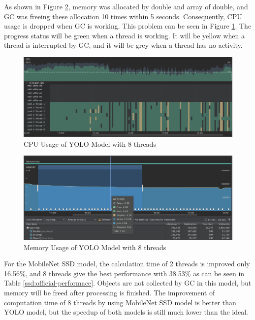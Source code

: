             As shown in Figure \ref{yolo:memoryUsage}, memory was allocated by double and array of double,
                and GC was freeing these allocation 10 times within 5 seconds.
            Consequently, CPU usage is dropped when GC is working.
                This problem can be seen in Figure \ref{yolo:cpuUsage}.
                The progress status will be green when a thread is working.
                It will be yellow when a thread is interrupted by GC,
                and it will be grey when a thread has no activity.

            \begin{figure}[!ht]
                \includegraphics[width=6in]{images/chapter5/YOLO/cpu-8-thread-crop.png}
                \caption{CPU Usage of YOLO Model with 8 threads}
                \label{yolo:cpuUsage}
            \end{figure}

            \begin{figure}[!ht]
                \includegraphics[width=6in]{images/chapter5/gc-problem/gc-collecting-crop.png}
                \caption{Memory Usage of YOLO Model with 8 threads}
                \label{yolo:memoryUsage}
            \end{figure}

            For the MobileNet SSD model,
            the calculation time of 2 threads is improved only 16.56\%,
            and 8 threads give the best performance with 38.53\% as can be seen in Table \ref{ssd:official-performace}.
            Objects are not collected by GC in this model, but memory will be freed after processing is finished.
            The improvement of computation time of 8 threads by using MobileNet SSD model is better than YOLO model,
            but the speedup of both models is still much lower than the ideal.

